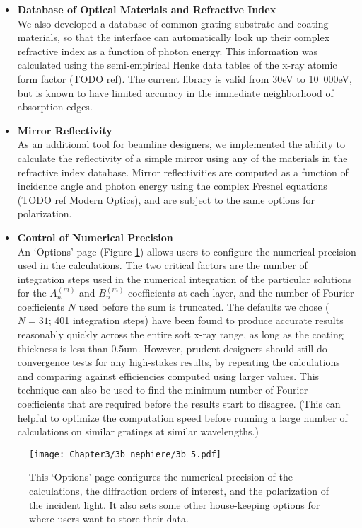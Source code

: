 \begin{itemize}
\item \textbf{Database of Optical Materials and Refractive Index}\\
We also developed a database of common grating substrate and coating materials, so that the interface can automatically look up their complex refractive index as a function of photon energy.  This information was calculated using the semi-empirical Henke data tables of the x-ray atomic form factor (TODO ref).  The current library is valid from 30eV to 10~000eV, but is known to have limited accuracy in the immediate neighborhood of absorption edges.

\item \textbf{Mirror Reflectivity}\\
As an additional tool for beamline designers, we implemented the ability to calculate the reflectivity of a simple mirror using any of the materials in the refractive index database.  Mirror reflectivities are computed as a function of incidence angle and photon energy using the complex Fresnel equations (TODO ref Modern Optics), and are subject to the same options for polarization.

\item \textbf{Control of Numerical Precision}\\
An `Options' page (Figure \ref{3b_5}) allows users to configure the numerical precision used in the calculations.  The two critical factors are the number of integration steps used in the numerical integration of the particular solutions for the $A_n^{(m)}$ and $B_n^{(m)}$ coefficients at each layer, and the number of Fourier coefficients $N$ used before the sum is truncated.  The defaults we chose ($N=31$; 401 integration steps) have been found to produce accurate results reasonably quickly across the entire soft x-ray range, as long as the coating thickness is less than 0.5um.   However, prudent designers should still do convergence tests for any high-stakes results, by repeating the calculations and comparing against efficiencies computed using larger values.  This technique can also be used to find the minimum number of Fourier coefficients that are required before the results start to disagree.  (This can helpful to optimize the computation speed before running a large number of calculations on similar gratings at similar wavelengths.)
\end{itemize}

\begin{figure}[p] %
   \centering
   \texttt{[image: Chapter3/3b\_nephiere/3b\_5.pdf]}
   \caption{This `Options' page configures the numerical precision of the calculations, the diffraction orders of interest, and the polarization of the incident light.  It also sets some other house-keeping options for where users want to store their data.}
   \label{3b_5}
\end{figure}

